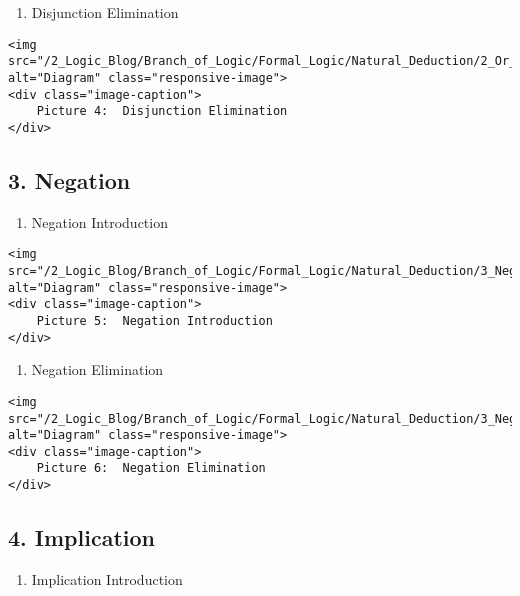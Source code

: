 \begin{enumerate}
\def\labelenumi{\alph{enumi}.}
\setcounter{enumi}{1}
\tightlist
\item
  Disjunction Elimination
\end{enumerate}

\begin{verbatim}
<img src="/2_Logic_Blog/Branch_of_Logic/Formal_Logic/Natural_Deduction/2_Or_Elim.png" alt="Diagram" class="responsive-image">
<div class="image-caption">
    Picture 4:  Disjunction Elimination
</div>
\end{verbatim}

\subsection{3. Negation}\label{negation}

\begin{enumerate}
\def\labelenumi{\alph{enumi}.}
\tightlist
\item
  Negation Introduction
\end{enumerate}

\begin{verbatim}
<img src="/2_Logic_Blog/Branch_of_Logic/Formal_Logic/Natural_Deduction/3_Neg_intro.png" alt="Diagram" class="responsive-image">
<div class="image-caption">
    Picture 5:  Negation Introduction
</div>
\end{verbatim}

\begin{enumerate}
\def\labelenumi{\alph{enumi}.}
\setcounter{enumi}{1}
\tightlist
\item
  Negation Elimination
\end{enumerate}

\begin{verbatim}
<img src="/2_Logic_Blog/Branch_of_Logic/Formal_Logic/Natural_Deduction/3_Neg_Elim.png" alt="Diagram" class="responsive-image">
<div class="image-caption">
    Picture 6:  Negation Elimination
</div>
\end{verbatim}

\subsection{4. Implication}\label{implication}

\begin{enumerate}
\def\labelenumi{\alph{enumi}.}
\tightlist
\item
  Implication Introduction
\end{enumerate}

